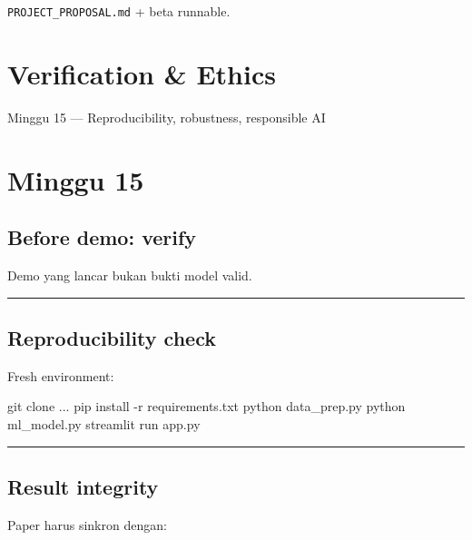\documentclass[
  indonesian,
  letterpaper,
  DIV=11,
  numbers=noendperiod]{scrreprt}
\newenvironment{Shaded}{\begin{snugshade}}{\end{snugshade}}
\newcommand{\AttributeTok}[1]{\textcolor[rgb]{0.40,0.45,0.13}{#1}}
\newcommand{\ExtensionTok}[1]{\textcolor[rgb]{0.00,0.23,0.31}{#1}}
\newcommand{\FunctionTok}[1]{\textcolor[rgb]{0.28,0.35,0.67}{#1}}
\newcommand{\NormalTok}[1]{\textcolor[rgb]{0.00,0.23,0.31}{#1}}
\begin{document}
\texttt{PROJECT\_PROPOSAL.md} + beta runnable.

\chapter{Verification \& Ethics}\label{verification-ethics}

Minggu 15 --- Reproducibility, robustness, responsible AI

\hfill\break

\chapter{Minggu 15}\label{minggu-15}

\section{Before demo: verify}\label{before-demo-verify}

Demo yang lancar bukan bukti model valid.

\begin{center}\rule{0.5\linewidth}{0.5pt}\end{center}

\section{Reproducibility check}\label{reproducibility-check}

Fresh environment:

\begin{Shaded}
\begin{Highlighting}[]
\FunctionTok{git}\NormalTok{ clone ...}
\ExtensionTok{pip}\NormalTok{ install }\AttributeTok{{-}r}\NormalTok{ requirements.txt}
\ExtensionTok{python}\NormalTok{ data\_prep.py}
\ExtensionTok{python}\NormalTok{ ml\_model.py}
\ExtensionTok{streamlit}\NormalTok{ run app.py}
\end{Highlighting}
\end{Shaded}

\begin{center}\rule{0.5\linewidth}{0.5pt}\end{center}

\section{Result integrity}\label{result-integrity}

Paper harus sinkron dengan:
\end{document}
